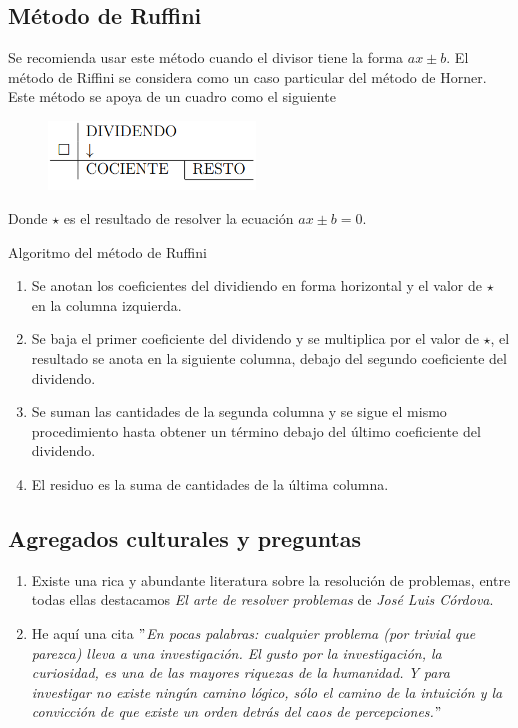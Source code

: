\subsection{Método de Ruffini}

Se recomienda usar este método cuando el divisor tiene la forma $ax \pm b$.
El método de Riffini se considera como un caso particular del método de Horner.
Este método se apoya de un cuadro como el siguiente
\begin{figure}[htb]
    \centering
    \includegraphics[width=5.5cm]{images/metodo-de-ruffini}
\end{figure}

Donde $\star$ es el resultado de resolver la ecuación $ax \pm b = 0$.

Algoritmo del método de Ruffini
\begin{enumerate}
    \item Se anotan los coeficientes del dividiendo en forma horizontal y el valor de $\star$ en la columna izquierda.
    \item Se baja el primer coeficiente del dividendo y se multiplica por el valor de $\star$, el resultado se anota en la siguiente columna,
    debajo del segundo coeficiente del dividendo.
    \item Se suman las cantidades de la segunda columna y se sigue el mismo procedimiento hasta obtener un término debajo del último coeficiente del dividendo.
    \item El residuo es la suma de cantidades de la última columna.
\end{enumerate}



\subsection{Agregados culturales y preguntas}

\begin{enumerate}
    \item Existe una rica y abundante literatura sobre la resolución de problemas, entre todas ellas destacamos \textit{El arte de resolver problemas} de \textit{José Luis Córdova}.
    \item He aquí una cita \textit{\("\)En pocas palabras: cualquier problema (por trivial que parezca) lleva a una investigación.
    El gusto por la investigación, la curiosidad, es una de las mayores riquezas de la humanidad.
    Y para investigar no existe ningún camino lógico, sólo el camino de la intuición y la convicción de que existe un orden detrás del caos de percepciones.\("\)}
\end{enumerate}



